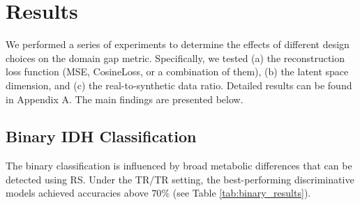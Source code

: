 \chapter{Results}
\label{sec:results}

We performed a series of experiments to determine the effects of different design choices on the domain gap metric. Specifically, we tested (a) the reconstruction loss function (MSE, CosineLoss, or a combination of them), (b) the latent space dimension, and (c) the real-to-synthetic data ratio. Detailed results can be found in Appendix A. The main findings are presented below.

\section{Binary IDH Classification}
\label{sec:results_binary}

The binary classification is influenced by broad metabolic differences that can be detected using RS. Under the TR/TR setting, the best-performing discriminative models achieved accuracies above $70\%$ (see Table \ref{tab:binary_results}).

